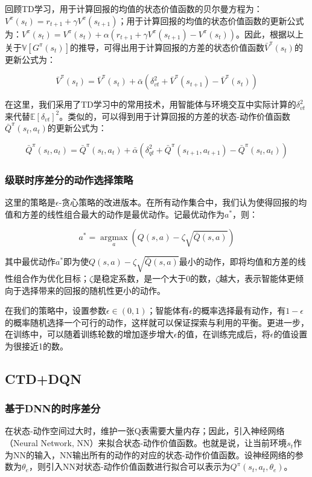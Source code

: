 \documentclass[UTF8]{ctexart}
\begin{document}
回顾TD学习，用于计算回报的均值的状态价值函数的贝尔曼方程为：$V^{\pi}(s_t) = r_{t+1} + \gamma V^{\pi}(s_{t+1})$；用于计算回报的均值的状态价值函数的更新公式为：$V^{\pi}(s_t) = V^{\pi}(s_t) + \alpha (r_{t+1} + \gamma V^{\pi}(s_{t+1}) - V^{\pi}(s_t))$。因此，根据以上关于$\mathbb{V}[G^{\pi}(s_t)]$的推导，可得出用于计算回报的方差的状态价值函数$\bar{V}^{\pi}(s_t)$的更新公式为：

$$
\bar{V}^{\pi}(s_t) = \bar{V}^{\pi}(s_t) + \bar{\alpha}(\delta_{vt}^2 + \bar{V}^{\pi}(s_{t+1}) - \bar{V}^{\pi}(s_t))
$$

在这里，我们采用了TD学习中的常用技术，用智能体与环境交互中实际计算的$\delta_{vt}^2$来代替$\mathbb{E}[\delta_{vt}]^2$。类似的，可以得到用于计算回报的方差的状态-动作价值函数$\bar{Q}^{\pi}(s_t, a_t)$的更新公式为：

$$
\bar{Q}^{\pi}(s_t, a_t) = \bar{Q}^{\pi}(s_t, a_t) + \bar{\alpha}(\delta_{qt}^2 + \bar{Q}^{\pi}(s_{t+1}, a_{t+1}) - \bar{Q}^{\pi}(s_t, a_t))
$$

\subsubsection{级联时序差分的动作选择策略}

这里的策略是$\epsilon$-贪心策略的改进版本。在所有动作集合中，我们认为使得回报的均值和方差的线性组合最大的动作是最优动作。记最优动作为$a^*$，则：

$$a^* = \mathop{\arg\max}\limits_{a} (Q(s, a) - \zeta \sqrt{\bar{Q}(s, a)})$$

其中最优动作$a^*$即为使$Q(s, a) - \zeta \sqrt{\bar{Q}(s, a)}$最小的动作，即将均值和方差的线性组合作为优化目标；$\zeta$是稳定系数，是一个大于0的数，$\zeta$越大，表示智能体更倾向于选择带来的回报的随机性更小的动作。

在我们的策略中，设置参数$\epsilon \in (0, 1)$；智能体有$\epsilon$的概率选择最有动作，有$1-\epsilon$的概率随机选择一个可行的动作，这样就可以保证探索与利用的平衡。更进一步，在训练中，可以随着训练轮数的增加逐步增大$\epsilon$的值，在训练完成后，将$\epsilon$的值设置为很接近1的数。

\subsection{CTD+DQN}

\subsubsection{基于DNN的时序差分}

在状态-动作空间过大时，维护一张Q表需要大量内存；因此，引入神经网络（Neural Network, NN）来拟合状态-动作价值函数。也就是说，让当前环境$s_t$作为NN的输入，NN输出所有的动作的对应的状态-动作价值函数。设神经网络的参数为$\theta_e$，则引入NN对状态-动作价值函数进行拟合可以表示为$Q^\pi(s_t, a_t, \theta_e)$。
\end{document}
